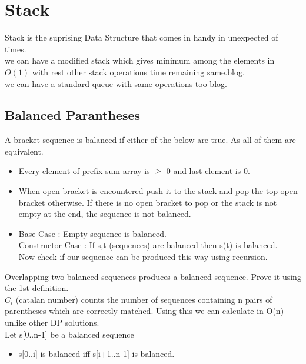 \documentclass[../Notes.tex]{subfiles}
\begin{document}
\chapter{Stack}
Stack is the suprising Data Structure that comes in handy in unexpected of times.\\

we can have a modified stack which gives minimum among the elements in $O(1)$ with rest other stack operations time remaining same.\href{./Material/Minimum stack _ Minimum queue .html}{blog}.\\ 

we can have a standard queue with same operations too \href{./Material/Sliding Window Minimum Implementations.html}{blog}.

\section{Balanced Parantheses}
A bracket sequence is balanced if either of the below are true. As all of them are equivalent.

\begin{itemize}
  \item Every element of prefix sum array is $\geq$ 0 and last element is 0.
  \item When open bracket is encountered push it to the stack and pop the top open bracket otherwise. If there is no open bracket to pop or the stack is not empty at the end, the sequence is not balanced.
  \item Base Case : Empty sequence is balanced.\\
  Constructor Case : If s,t (sequences) are balanced then s(t) is balanced.\\
  Now check if our sequence can be produced this way using recursion. 
\end{itemize}

Overlapping two balanced sequences produces a balanced sequence. Prove it using the 1st definition. \\

$C_{i}$ (catalan number) counts the number of sequences containing n pairs of parentheses which are correctly matched. Using this we can calculate in O(n) unlike other DP solutions.\\

Let s[0..n-1] be a balanced sequence
\begin{itemize}
	\item s[0..i] is balanced iff s[i+1..n-1] is balanced.	
\end{itemize}
\end{document}
